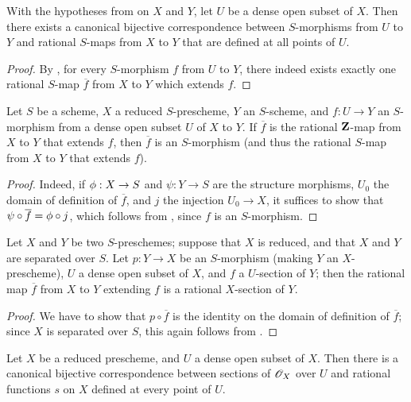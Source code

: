 \begin{cor}[7.2.3]
\label{1.7.2.3}
With the hypotheses from  on $X$ and $Y$, let $U$ be a dense open subset of $X$.
Then there exists a canonical bijective correspondence between $S$-morphisms from $U$ to $Y$ and rational $S$-maps from $X$ to $Y$ that are defined at all points of $U$.
\end{cor}

\begin{proof}
\label{proof-1.7.2.3}
By , for every $S$-morphism $f$ from $U$ to $Y$, there indeed exists exactly one rational $S$-map $\overline{f}$ from $X$ to $Y$ which extends $f$.
\end{proof}

\begin{cor}[7.2.4]
\label{1.7.2.4}
Let $S$ be a scheme, $X$ a reduced $S$-prescheme, $Y$ an $S$-scheme, and $f:U\to Y$ an $S$-morphism from a dense open subset $U$ of $X$ to $Y$.
If $\overline{f}$ is the rational $\mathbf{Z}$-map from $X$ to $Y$ that extends $f$, then $\overline{f}$ is an $S$-morphism (and thus the rational $S$-map from $X$ to $Y$ that extends $f$).
\end{cor}

\begin{proof}
\label{proof-1.7.2.4}
Indeed, if $\phi:X\to S$ and $\psi:Y\to S$ are the structure morphisms, $U_0$ the domain of definition of $\overline{f}$, and $j$ the injection $U_0\to X$, it suffices to show that $\psi\circ\overline{f}=\phi\circ j$, which follows from , since $f$ is an $S$-morphism.
\end{proof}

\begin{cor}[7.2.5]
\label{1.7.2.5}
Let $X$ and $Y$ be two $S$-preschemes; suppose that $X$ is reduced, and that $X$ and $Y$ are separated over $S$.
Let $p:Y\to X$ be an $S$-morphism (making $Y$ an $X$-prescheme), $U$ a dense open subset of $X$, and $f$ a $U$-section of $Y$; then the rational map $\overline{f}$ from $X$ to $Y$ extending $f$ is a rational $X$-section of $Y$.
\end{cor}

\begin{proof}
\label{proof-1.7.2.5}
We
have to show that $p\circ\overline{f}$ is the identity on the domain of definition of $\overline{f}$; since $X$ is separated over $S$, this again follows from .
\end{proof}

\begin{cor}[7.2.6]
\label{1.7.2.6}
Let $X$ be a reduced prescheme, and $U$ a dense open subset of $X$.
Then there is a canonical bijective correspondence between sections of $\mathscr{O}_X$ over $U$ and rational functions $s$ on $X$ defined at every point of $U$.
\end{cor}

